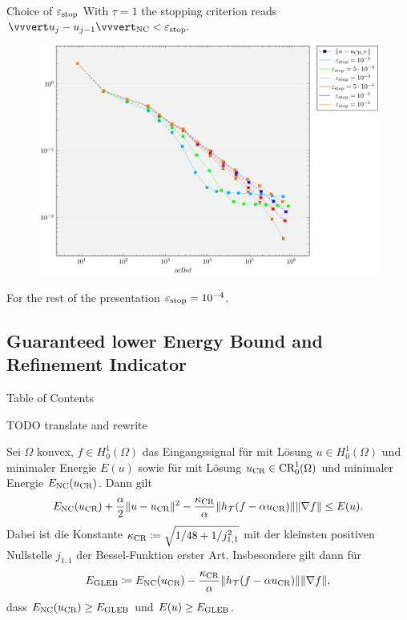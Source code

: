 \begin{frame}{Choice of $\varepsilon_\textup{stop}$}
  With $\tau=1$ the stopping criterion reads $\vvvert u_j-u_{j-1}\vvvert_\nc<
  \varepsilon_\textup{stop}.$
  \begin{figure}[!ht]
    \centering
    \includegraphics[width=0.8\linewidth]
      {pictures/experiments/choiceOfParameters/epsStop/convergence.pdf}
  \end{figure}

  \pause
  For the rest of the presentation $\varepsilon_\textup{stop} = 10^{-4}$.
\end{frame}


\subsection{Guaranteed lower Energy Bound and Refinement Indicator}
\begin{frame}[noframenumbering]{Table of Contents}
\end{frame}

\begin{frame}
  TODO translate and rewrite
  \begin{theorem}
    \label{thm:gleb}
    Sei $\Omega$ konvex, $f\in H^1_0(\Omega)$ das Eingangssignal für
    mit Lösung $u\in H^1_0(\Omega)$ und minimaler
    Energie $E(u)$ sowie für  mit Lösung $u_\textup{CR}\in
    \textup{CR}^1_0(\Omega)$ und minimaler Energie $E_\textup{NC}(u_\textup{CR})$.
    Dann gilt
    \begin{align*}
      E_\textup{NC}(u_\textup{CR})+\frac{\alpha}{2}\Vert u-u_\textup{CR}\Vert^2
      -\frac{\kappa_{\textup{CR}}}{\alpha}\Vert
      h_{\mathcal{T}}(f-\alpha u_\textup{CR})\Vert \Vert\nabla f\Vert\leq E(u).
    \end{align*}
    Dabei ist die Konstante $\kappa_{\textup{CR}}\coloneqq\sqrt{1/48+1/j_{1,1}^2}$ mit der
    kleinsten positiven Nullstelle $j_{1,1}$ der Bessel-Funktion erster Art.
    Insbesondere gilt dann für 
    \begin{align}
      \label{eq:gleb}
      E_\textup{GLEB} 
      \coloneqq 
      E_\textup{NC}(u_\textup{CR}) - \frac{\kappa_{\textup{CR}}}{\alpha}\Vert h_{\mathcal{T}}(f-\alpha u_\textup{CR})\Vert
      \Vert \nabla f\Vert,
    \end{align}
      dass $E_\textup{NC}(u_\textup{CR})\geq E_\textup{GLEB}$ und $E(u)\geq E_\textup{GLEB}$.
  \end{theorem}
\end{frame}



